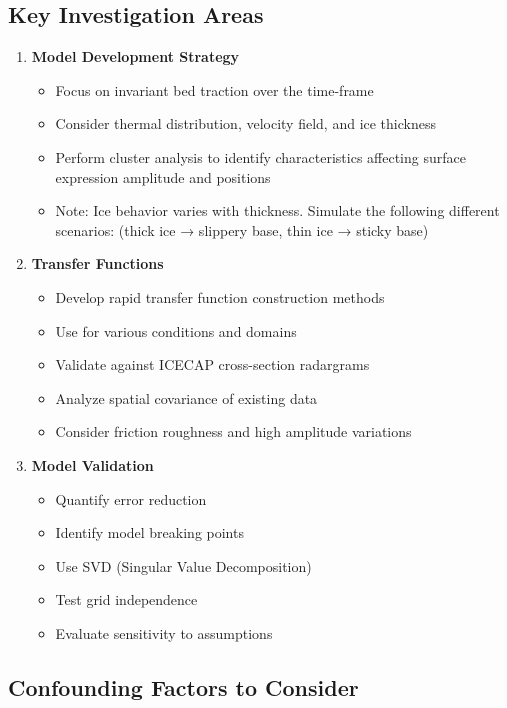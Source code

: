 \subsection*{Key Investigation Areas}

\begin{enumerate}
\item\textbf{Model Development Strategy}
    \begin{itemize}
    \item Focus on invariant bed traction over the time-frame
    \item Consider thermal distribution, velocity field, and ice thickness
    \item Perform cluster analysis to identify characteristics affecting surface expression amplitude and positions
    \item Note: Ice behavior varies with thickness. Simulate the following different scenarios: (thick ice → slippery base, thin ice → sticky base)
    \end{itemize}
\item\textbf{Transfer Functions}
    \begin{itemize}
    \item Develop rapid transfer function construction methods
    \item Use for various conditions and domains
    \item Validate against ICECAP cross-section radargrams
    \item Analyze spatial covariance of existing data
    \item Consider friction roughness and high amplitude variations
    \end{itemize}
\item\textbf{Model Validation}
    \begin{itemize}
    \item Quantify error reduction
    \item Identify model breaking points
    \item Use SVD (Singular Value Decomposition)
    \item Test grid independence
    \item Evaluate sensitivity to assumptions
    \end{itemize}
\end{enumerate}


\subsection*{Confounding Factors to Consider}

